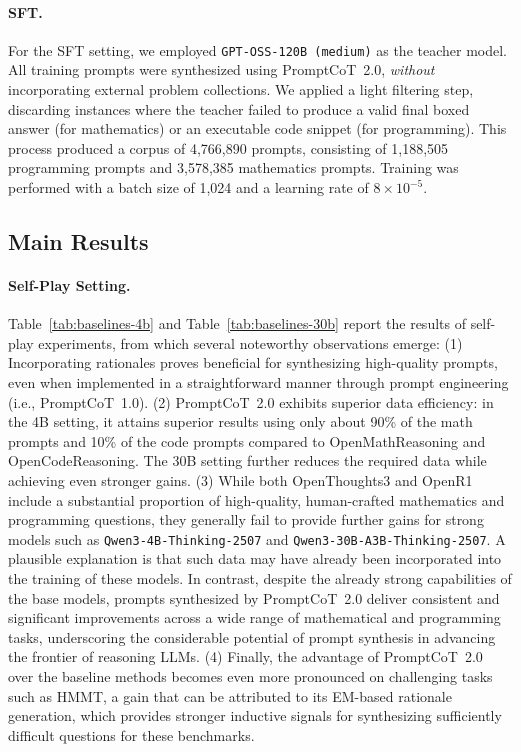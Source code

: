\paragraph{SFT.}
For the SFT setting, we employed \texttt{GPT-OSS-120B (medium)} as the teacher model. 
All training prompts were synthesized using PromptCoT~2.0, \textit{without} incorporating external problem collections. 
We applied a light filtering step, discarding instances where the teacher failed to produce a valid final boxed answer (for mathematics) or an executable code snippet (for programming). 
This process produced a corpus of 4,766,890 prompts, consisting of 1,188,505 programming prompts and 3,578,385 mathematics prompts. 
Training was performed with a batch size of 1,024 and a learning rate of $8 \times 10^{-5}$.




\subsection{Main Results}
\paragraph{Self-Play Setting.}
Table~\ref{tab:baselines-4b} and Table~\ref{tab:baselines-30b} report the results of self-play experiments, from which several noteworthy observations emerge: (1) Incorporating rationales proves beneficial for synthesizing high-quality prompts, even when implemented in a straightforward manner through prompt engineering (i.e., PromptCoT~1.0). 
(2) PromptCoT~2.0 exhibits superior data efficiency: in the 4B setting, it attains superior results using only about 90\% of the math prompts and 10\% of the code prompts compared to OpenMathReasoning and OpenCodeReasoning. The 30B setting further reduces the required data while achieving even stronger gains.
(3) While both OpenThoughts3 and OpenR1 include a substantial proportion of high-quality, human-crafted mathematics and programming questions, they generally fail to provide further gains for strong models such as \texttt{Qwen3-4B-Thinking-2507} and \texttt{Qwen3-30B-A3B-Thinking-2507}. A plausible explanation is that such data may have already been incorporated into the training of these models. In contrast, despite the already strong capabilities of the base models, prompts synthesized by PromptCoT~2.0 deliver consistent and significant improvements across a wide range of mathematical and programming tasks, underscoring the considerable potential of prompt synthesis in advancing the frontier of reasoning LLMs. (4) Finally, the advantage of PromptCoT~2.0 over the baseline methods becomes even more pronounced on challenging tasks such as HMMT, a gain that can be attributed to its EM-based rationale generation, which provides stronger inductive signals for synthesizing sufficiently difficult questions for these benchmarks.

